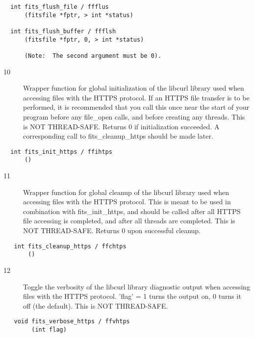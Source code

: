 \documentclass[11pt]{book}
\begin{document}
\begin{verbatim}
  int fits_flush_file / ffflus
      (fitsfile *fptr, > int *status)

  int fits_flush_buffer / ffflsh
      (fitsfile *fptr, 0, > int *status)

      (Note:  The second argument must be 0).
\end{verbatim}

\begin{description}
\item[10 ] Wrapper function for global initialization of the libcurl library used
   when accessing files with the HTTPS protocol.  If an HTTPS file transfer is to
   be performed, it is recommended that you call this once near the start of your program
   before any file\_open calls, and before creating any threads.  This is NOT THREAD-SAFE.
   Returns 0 if initialization succeeded.
   A corresponding call to fits\_cleanup\_https should be made later.
  \label{ffihtps}
\end{description}

\begin{verbatim}
  int fits_init_https / ffihtps
      ()
\end{verbatim}

\begin{description}
\item[11 ] Wrapper function for global cleanup of the libcurl library used when
   accessing files with the HTTPS protocol.  This is meant to be used in combination 
   with fits\_init\_https, and should be called after all HTTPS file accessing is completed,
   and after all threads are completed.  This is NOT THREAD-SAFE.  Returns 0 upon successful
   cleanup.
  \label{ffchtps}
\end{description}

\begin{verbatim}
   int fits_cleanup_https / ffchtps
       ()
\end{verbatim}

\begin{description}
\item[12 ] Toggle the verbosity of the libcurl library diagnostic output when
   accessing files with the HTTPS protocol.  'flag' = 1 turns the output
   on, 0 turns it off (the default).  This is NOT THREAD-SAFE.
  \label{ffvhtps}
\end{description}

\begin{verbatim}
   void fits_verbose_https / ffvhtps
        (int flag)
\end{verbatim}
\end{document}
